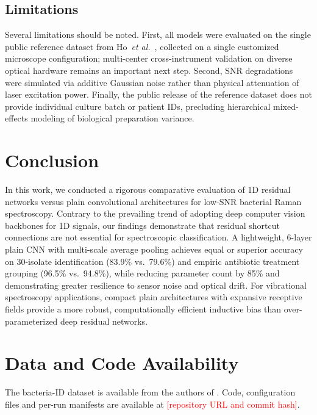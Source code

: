 \documentclass[journal,onecolumn]{IEEEtran}
\newcommand{\TBD}[1]{\textcolor{red}{[#1]}}
\begin{document}
\subsection{Limitations}
\label{sec:disc-limitations}
Several limitations should be noted. First, all models were evaluated on the
single public reference dataset from Ho~\textit{et al.}~\cite{ho2019rapid},
collected on a single customized microscope configuration; multi-center cross-instrument
validation on diverse optical hardware remains an important next step. Second, SNR
degradations were simulated via additive Gaussian noise rather than physical
attenuation of laser excitation power. Finally, the public release of the reference
dataset does not provide individual culture batch or patient IDs, precluding
hierarchical mixed-effects modeling of biological preparation variance.

\section{Conclusion}
\label{sec:conclusion}
In this work, we conducted a rigorous comparative evaluation of 1D residual networks
versus plain convolutional architectures for low-SNR bacterial Raman spectroscopy.
Contrary to the prevailing trend of adopting deep computer vision backbones for 1D
signals, our findings demonstrate that residual shortcut connections are not
essential for spectroscopic classification. A lightweight, 6-layer plain CNN with
multi-scale average pooling achieves equal or superior accuracy on 30-isolate
identification (83.9\% vs.\ 79.6\%) and empiric antibiotic treatment grouping
(96.5\% vs.\ 94.8\%), while reducing parameter count by 85\% and demonstrating
greater resilience to sensor noise and optical drift. For vibrational spectroscopy
applications, compact plain architectures with expansive receptive fields provide
a more robust, computationally efficient inductive bias than over-parameterized
deep residual networks.

\section*{Data and Code Availability}
The bacteria-ID dataset is available from the authors of
\cite{ho2019rapid}. Code, configuration files and per-run manifests are
available at \TBD{repository URL and commit hash}.
\end{document}
